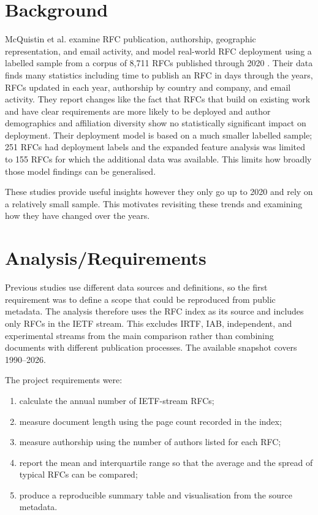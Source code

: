 \documentclass{l4proj}
\begin{document}
\chapter{Background}
McQuistin et al. examine RFC publication, authorship, geographic representation, and email activity, and model real-world RFC deployment using a labelled sample from a corpus of 8,711 RFCs published through 2020 \citep{McQuistin2021}. Their data finds many statistics including time to publish an RFC in days through the years, RFCs updated in each year, authorship by country and company, and email activity. They report changes like the fact that RFCs that build on existing work and have clear requirements are more likely to be deployed and author demographics and affiliation diversity show no statistically significant impact on deployment. Their deployment model is based on a much smaller labelled sample; 251 RFCs had deployment labels and the expanded feature analysis was limited to 155 RFCs for which the additional data was available. This limits how broadly those model findings can be generalised.

These studies provide useful insights however they only go up to 2020 and rely on a relatively small sample. This motivates revisiting these trends and examining how they have changed over the years.

\chapter{Analysis/Requirements}
Previous studies use different data sources and definitions, so the first requirement was to define a scope that could be reproduced from public metadata. The analysis therefore uses the RFC index as its source and includes only RFCs in the IETF stream. This excludes IRTF, IAB, independent, and experimental streams from the main comparison rather than combining documents with different publication processes. The available snapshot covers 1990--2026.

The project requirements were:
\begin{enumerate}
    \item calculate the annual number of IETF-stream RFCs;
    \item measure document length using the page count recorded in the index;
    \item measure authorship using the number of authors listed for each RFC;
    \item report the mean and interquartile range so that the average and the spread of typical RFCs can be compared;
    \item produce a reproducible summary table and visualisation from the source metadata.
\end{enumerate}
\end{document}

